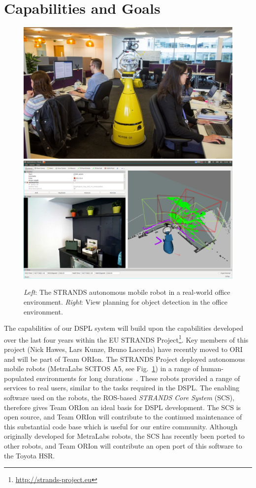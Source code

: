 \documentclass[runningheads,a4paper]{llncs}
\newcommand{\teamori}{Team ORIon}
\begin{document}
\section{Capabilities and Goals}

\begin{figure}[tb]
  \begin{center}
    \includegraphics[width=.43\columnwidth]{images/betty.jpg}
    \includegraphics[width=.55\columnwidth,clip,trim=10ex 20ex 10ex 20ex]{images/viewplanning_at_tsc.png}
  \end{center} 
  \vspace{-10pt}  
  \caption{\textit{Left}: The STRANDS autonomous mobile robot in a real-world
  office environment. \textit{Right}: View planning for object detection in the
  office environment.}
  \label{fig:mk}
  \vspace{-3ex}
\end{figure}

The capabilities of our DSPL system will build upon the capabilities developed over the last four years within the EU STRANDS Project\footnote{\url{http://strands-project.eu}}. Key members of this project (Nick Hawes, Lars Kunze, Bruno Lacerda) have recently moved to ORI and will be part of \teamori. The STRANDS Project deployed autonomous mobile robots (MetraLabs SCITOS A5, see Fig.~\ref{fig:mk}) in a range of human-populated environments for long durations~\cite{strands@ram}. These robots provided a range of services to real users, similar to the tasks required in the DSPL. The enabling software used on the robots, the ROS-based \emph{STRANDS Core System} (SCS), therefore gives \teamori{} an ideal basis for DSPL development. The SCS is open source, and \teamori{} will contribute to the continued maintenance of this substantial code base which is useful for our entire community. Although originally developed for MetraLabs robots, the SCS has recently been ported to other robots, and \teamori{} will contribute an open port of this software to the Toyota HSR. 
\end{document}
